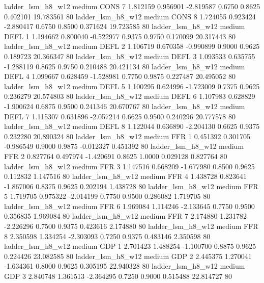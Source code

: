      ladder_lsm_h8_w12     medium     CONS                 7  1.812159 0.956901 -2.819587 0.6750 0.8625  0.402101   19.783561 80
     ladder_lsm_h8_w12     medium     CONS                 8  1.724055 0.923424 -2.880417 0.6750 0.8500  0.371624   19.723585 80
     ladder_lsm_h8_w12     medium     DEFL                 1  1.194662 0.800040 -0.522977 0.9375 0.9750  0.170099   20.317443 80
     ladder_lsm_h8_w12     medium     DEFL                 2  1.106719 0.670358 -0.990899 0.9000 0.9625  0.189723   20.366347 80
     ladder_lsm_h8_w12     medium     DEFL                 3  1.093533 0.635755 -1.288119 0.8625 0.9750  0.210488   20.421134 80
     ladder_lsm_h8_w12     medium     DEFL                 4  1.099667 0.628459 -1.528981 0.7750 0.9875  0.227487   20.495052 80
     ladder_lsm_h8_w12     medium     DEFL                 5  1.100295 0.624996 -1.723009 0.7375 0.9625  0.236279   20.574803 80
     ladder_lsm_h8_w12     medium     DEFL                 6  1.107983 0.628829 -1.900624 0.6875 0.9500  0.241346   20.670767 80
     ladder_lsm_h8_w12     medium     DEFL                 7  1.115307 0.631896 -2.057214 0.6625 0.9500  0.240296   20.777578 80
     ladder_lsm_h8_w12     medium     DEFL                 8  1.122044 0.636890 -2.204130 0.6625 0.9375  0.232280   20.890324 80
     ladder_lsm_h8_w12     medium      FFR                 1  0.451392 0.301705 -0.986549 0.9000 0.9875 -0.012327    0.451392 80
     ladder_lsm_h8_w12     medium      FFR                 2  0.827764 0.497974 -1.420691 0.8625 1.0000  0.029128    0.827764 80
     ladder_lsm_h8_w12     medium      FFR                 3  1.147516 0.668209 -1.677980 0.8500 0.9625  0.112832    1.147516 80
     ladder_lsm_h8_w12     medium      FFR                 4  1.438728 0.823641 -1.867006 0.8375 0.9625  0.202194    1.438728 80
     ladder_lsm_h8_w12     medium      FFR                 5  1.719705 0.975322 -2.014199 0.7750 0.9500  0.286082    1.719705 80
     ladder_lsm_h8_w12     medium      FFR                 6  1.969084 1.114246 -2.133645 0.7750 0.9500  0.356835    1.969084 80
     ladder_lsm_h8_w12     medium      FFR                 7  2.174880 1.231782 -2.226296 0.7500 0.9375  0.423616    2.174880 80
     ladder_lsm_h8_w12     medium      FFR                 8  2.350598 1.334254 -2.303093 0.7250 0.9375  0.483146    2.350598 80
     ladder_lsm_h8_w12     medium      GDP                 1  2.701423 1.488254 -1.100700 0.8875 0.9625  0.224426   23.082585 80
     ladder_lsm_h8_w12     medium      GDP                 2  2.445375 1.270041 -1.634361 0.8000 0.9625  0.305195   22.940328 80
     ladder_lsm_h8_w12     medium      GDP                 3  2.840748 1.361513 -2.364295 0.7250 0.9000  0.515488   22.814727 80
